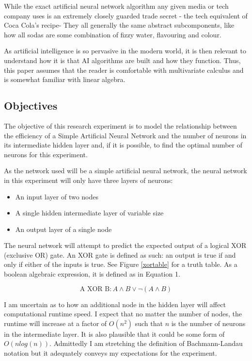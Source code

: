 \documentclass[12pt]{article}
\begin{document}
While the exact artificial neural network algorithm any given media or tech company uses is an extremely closely guarded trade secret - the tech equivalent of Coca Cola's recipe- They all generally the same abstract subcomponents, like how all sodas are some combination of fizzy water, flavouring and colour.

As artificial intelligence is so pervasive in the modern world, it is then relevant to understand how it is that AI algorithms are built and how they function. Thus, this paper assumes that the reader is comfortable with multivariate calculus and is somewhat familiar with linear algebra.

\subsection{Objectives \label{objectives}}

The objective of this research experiment is to model the relationship between the efficiency of a Simple Artificial Neural Network and the number of neurons in its intermediate hidden layer and, if it is possible, to find the optimal number of neurons for this experiment.

As the network used will be a simple artificial neural network, the neural network in this experiment will only have three layers of neurons:

\begin{itemize}
  \item An input layer of two nodes
  \item A single hidden intermediate layer of variable size
  \item An output layer of a single node
\end{itemize}

The neural network will attempt to predict the expected output of a logical XOR (exclusive OR) gate. An XOR gate is defined as such: an output is true if and only if either of the inputs is true. See Figure \ref{xortable} for a truth table. As a boolean algebraic expression, it is defined as in Equation 1.

\begin{equation}
  \textrm{A XOR B}: A \wedge B \vee \neg(A \wedge B)
\end{equation}


I am uncertain as to how an additional node in the hidden layer will affect computational runtime speed. I expect that no matter the number of nodes, the runtime will increase at a factor of $O(n^2)$ such that $n$ is the number of neurons in the intermediate layer. It is also plausible that it could be some form of $O(nlog(n))$. Admittedly I am stretching the definition of Bachmann-Landau notation but it adequately conveys my expectations for the experiment.
\end{document}
